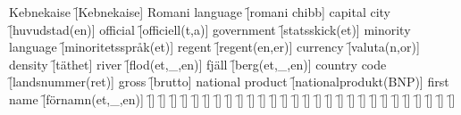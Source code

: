 \begin{questions}
\begin{multicols}{2}
        \question Kebnekaise \f[Kebnekaise]
        \question Romani language \f[romani chibb]
        \question capital city \f[huvudstad(en)]
        \question official \f[officiell(t,a)]
        \question government \f[statsskick(et)]
        \question minority language \f[minoritetsspråk(et)]
        \question regent \f[regent(en,er)]
        \question currency \f[valuta(n,or)]
        \question density \f[täthet]
        \question river \f[flod(et,\_,en)]
        \question fjäll \f[berg(et,\_,en)]
        \question country code \f[landsnummer(ret)]
        \question gross \f[brutto]
        \question national product \f[nationalprodukt(BNP)]
        \question first name \f[förnamn(et,\_,en)]
        \question  \f[]
        \question  \f[]
        \question  \f[]
        \question  \f[]
        \question  \f[]
        \question  \f[]
        \question  \f[]
        \question  \f[]
        \question  \f[]
        \question  \f[]
        \question  \f[]
        \question  \f[]
        \question  \f[]
        \question  \f[]
        \question  \f[]
        \question  \f[]
        \question  \f[]
        \question  \f[]
        \question  \f[]
        \question  \f[]
        \question  \f[]
        \question  \f[]
        \question  \f[]
        \question  \f[]
        \question  \f[]
        \question  \f[]
        \question  \f[]
        \question  \f[]
    \end{multicols}
\end{questions}
